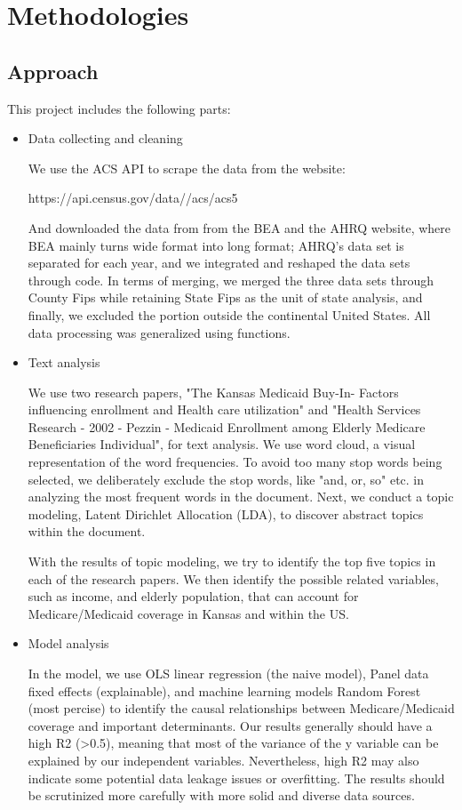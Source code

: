 \documentclass{article}
\begin{document}
\section{Methodologies}
\subsection{Approach}
This project includes the following parts:
\begin{itemize}
    \item Data collecting and cleaning
    
    We use the ACS API to scrape the data from the website: 
    
    https://api.census.gov/data/{}/acs/acs5

    And downloaded the data from from the BEA and the AHRQ website, where BEA mainly turns wide format into long format; AHRQ's data set is separated for each year, and we integrated and reshaped the data sets through code.
    In terms of merging, we merged the three data sets through County Fips while retaining State Fips as the unit of state analysis, and finally, we excluded the portion outside the continental United States. All data processing was generalized using functions.

    \item Text analysis

We use two research papers, "The Kansas Medicaid Buy-In- Factors influencing enrollment and Health care utilization" and "Health Services Research - 2002 - Pezzin - Medicaid Enrollment among Elderly Medicare Beneficiaries  Individual", for text analysis. We use word cloud, a visual representation of the word frequencies. To avoid too many stop words being selected, we deliberately exclude the stop words, like "and, or, so" etc. in analyzing the most frequent words in the document. Next, we conduct a topic modeling,  Latent Dirichlet Allocation (LDA), to  discover abstract topics within the document. 

With the results of topic modeling, we try to identify the top five topics in each of the research papers. We then identify the possible related variables, such as income, and elderly population, that can account for Medicare/Medicaid coverage in Kansas and within the US. 

    \item Model analysis

In the model, we use OLS linear regression (the naive model), Panel data fixed effects (explainable), and machine learning models Random Forest (most percise) to identify the causal relationships between Medicare/Medicaid coverage and important determinants. Our results generally should have a high R2 (>0.5), meaning that most of the variance of the y variable can be explained by our independent variables. Nevertheless, high R2 may also indicate some potential data leakage issues or overfitting. The results should be scrutinized more carefully with more solid and diverse data sources. 


\end{itemize}
\end{document}
